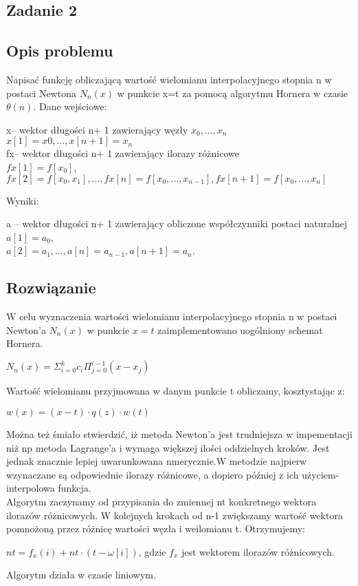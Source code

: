 \documentclass[11pt]{article}
\begin{document}
\begin{flushleft}
\section{Zadanie 2}
\subsection{Opis problemu}
Napisać funkcję obliczającą wartość wielomianu interpolacyjnego stopnia n w postaci Newtona $N_n(x)$ w punkcie x=t za pomocą algorytmu Hornera w czasie $\theta(n)$. Dane wejściowe:\\
\begin{center}
x– wektor długości n+ 1 zawierający węzły $x_0, ...,x_n$\\$x[1]=x0,...,x[n+1]=x_n$\\
fx– wektor długości n+ 1 zawierający ilorazy  różnicowe \\$fx[1]=f[x_0]$,\\
$fx[2]=f[x_0, x_1],...,fx[n]=f[x_0, . . . , x_{n−1}],fx[n+1]=f[x_0, . . . , x_n]$
\end{center}
\begin{flushleft}
Wyniki:
\begin{center}
a – wektor długości n+ 1 zawierający obliczone współczynniki postaci naturalnej\\
$a[1]=a_0$,\\
$a[2]=a_1,...,a[n]
=a_{n−1},a[n+1]=a_n$.\\
\end{center}
\end{flushleft}
\subsection{Rozwiązanie}
W celu wyznaczenia wartości wielomianu interpolacyjnego stopnia n w postaci Newton'a $N_n(x)$ w punkcie $x=t$ zaimplementowano uogólniony schemat Hornera.\\
\begin{center}
$N_n(x)=\Sigma^k_{i=0}c_i\Pi^{i-1}_{j=0}(x-x_j)$
\end{center}
Wartość wielomianu przyjmowana w danym punkcie t obliczamy, kosztystając z:\\
\begin{center}$w(x)=(x-t)\cdot q(z)\cdot w(t)$\end{center}
Można też śmiało stwierdzić, iż metoda Newton'a jest trudniejsza w impementacji niż np metoda Lagrange'a i wymaga większej ilości oddzielnych kroków. Jest jednak znacznie lepiej uwarunkowana nmerycznie.W metodzie najpierw wzynaczane są odpowiednie ilorazy różnicowe, a dopiero później z ich użyciem- interpolowa funkcja.\\
Algorytm zaczynamy od przypisania do zmiennej nt konkretnego wektora ilorazów różnicowych. W kolejnych krokach od n-1 zwiększamy wartość wektora pomnożoną przez różnicę wartości węzła i weilomianu t. Otrzymujemy:\\
\begin{center}
$nt=f_x(i)+nt\cdot (t-\omega[i])$, gdzie $f_x$ jest wektorem ilorazów różnicowych.\\
\end{center}
Algorytm działa w czasie liniowym.
\newpage

\end{flushleft}
\end{document}
